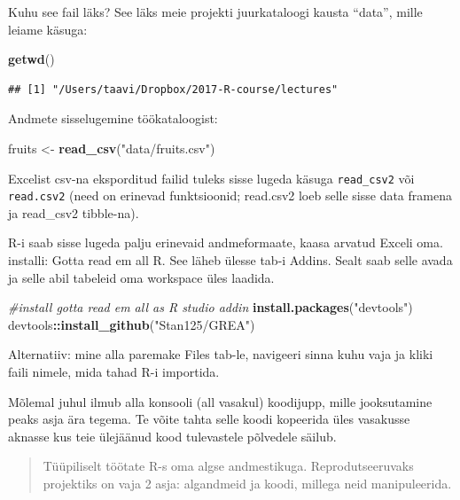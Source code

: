 \documentclass[]{book}
\newenvironment{Shaded}{\begin{snugshade}}{\end{snugshade}}
\newcommand{\KeywordTok}[1]{\textcolor[rgb]{0.13,0.29,0.53}{\textbf{#1}}}
\newcommand{\StringTok}[1]{\textcolor[rgb]{0.31,0.60,0.02}{#1}}
\newcommand{\CommentTok}[1]{\textcolor[rgb]{0.56,0.35,0.01}{\textit{#1}}}
\newcommand{\OperatorTok}[1]{\textcolor[rgb]{0.81,0.36,0.00}{\textbf{#1}}}
\newcommand{\NormalTok}[1]{#1}
\begin{document}
Kuhu see fail läks? See läks meie projekti juurkataloogi kausta
``data'', mille leiame käsuga:

\begin{Shaded}
\begin{Highlighting}[]
\KeywordTok{getwd}\NormalTok{()}
\end{Highlighting}
\end{Shaded}

\begin{verbatim}
## [1] "/Users/taavi/Dropbox/2017-R-course/lectures"
\end{verbatim}

Andmete sisselugemine töökataloogist:

\begin{Shaded}
\begin{Highlighting}[]
\NormalTok{fruits <-}\StringTok{  }\KeywordTok{read_csv}\NormalTok{(}\StringTok{"data/fruits.csv"}\NormalTok{)}
\end{Highlighting}
\end{Shaded}

Excelist csv-na eksporditud failid tuleks sisse lugeda käsuga
\texttt{read\_csv2} või \texttt{read.csv2} (need on erinevad
funktsioonid; read.csv2 loeb selle sisse data framena ja read\_csv2
tibble-na).

R-i saab sisse lugeda palju erinevaid andmeformaate, kaasa arvatud
Exceli oma. installi: Gotta read em all R. See läheb ülesse tab-i
Addins. Sealt saab selle avada ja selle abil tabeleid oma workspace üles
laadida.

\begin{Shaded}
\begin{Highlighting}[]
\CommentTok{#install gotta read em all as R studio addin}
\KeywordTok{install.packages}\NormalTok{(}\StringTok{"devtools"}\NormalTok{)}
\NormalTok{devtools}\OperatorTok{::}\KeywordTok{install_github}\NormalTok{(}\StringTok{"Stan125/GREA"}\NormalTok{)}
\end{Highlighting}
\end{Shaded}

Alternatiiv: mine alla paremake Files tab-le, navigeeri sinna kuhu vaja
ja kliki faili nimele, mida tahad R-i importida.

Mõlemal juhul ilmub alla konsooli (all vasakul) koodijupp, mille
jooksutamine peaks asja ära tegema. Te võite tahta selle koodi kopeerida
üles vasakusse aknasse kus teie ülejäänud kood tulevastele põlvedele
säilub.

\begin{quote}
Tüüpiliselt töötate R-s oma algse andmestikuga. Reprodutseeruvaks
projektiks on vaja 2 asja: algandmeid ja koodi, millega neid
manipuleerida.
\end{quote}
\end{document}

